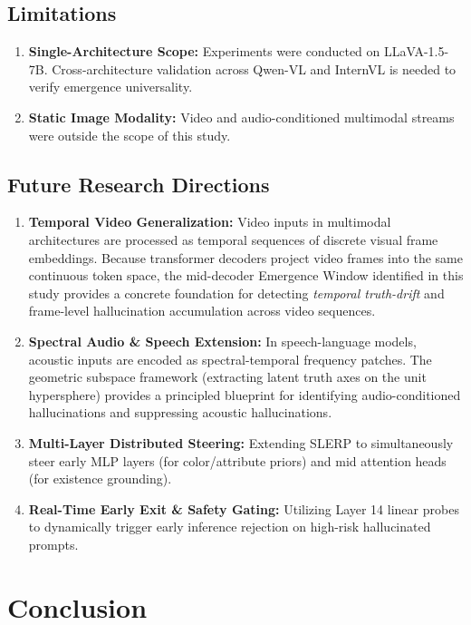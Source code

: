 \documentclass[11pt]{article}
\begin{document}
\subsection{Limitations}
\begin{enumerate}
    \item \textbf{Single-Architecture Scope:} Experiments were conducted on LLaVA-1.5-7B. Cross-architecture validation across Qwen-VL and InternVL is needed to verify emergence universality.
    \item \textbf{Static Image Modality:} Video and audio-conditioned multimodal streams were outside the scope of this study.
\end{enumerate}

\subsection{Future Research Directions}
\begin{enumerate}
    \item \textbf{Temporal Video Generalization:} Video inputs in multimodal architectures are processed as temporal sequences of discrete visual frame embeddings. Because transformer decoders project video frames into the same continuous token space, the mid-decoder Emergence Window identified in this study provides a concrete foundation for detecting \textit{temporal truth-drift} and frame-level hallucination accumulation across video sequences.
    \item \textbf{Spectral Audio \& Speech Extension:} In speech-language models, acoustic inputs are encoded as spectral-temporal frequency patches. The geometric subspace framework (extracting latent truth axes on the unit hypersphere) provides a principled blueprint for identifying audio-conditioned hallucinations and suppressing acoustic hallucinations.
    \item \textbf{Multi-Layer Distributed Steering:} Extending SLERP to simultaneously steer early MLP layers (for color/attribute priors) and mid attention heads (for existence grounding).
    \item \textbf{Real-Time Early Exit \& Safety Gating:} Utilizing Layer 14 linear probes to dynamically trigger early inference rejection on high-risk hallucinated prompts.
\end{enumerate}

\newpage
\section{Conclusion}
\end{document}
